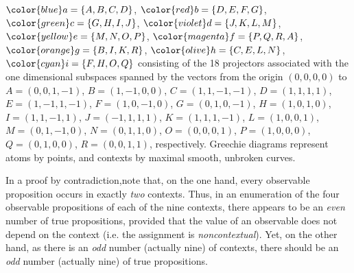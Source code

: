 $\color{blue}a=\{A,B,C,D\}$,
$\color{red}b=\{D,E,F,G\}$,
$\color{green}c=\{G,H,I,J\}$,
$\color{violet}d=\{J,K,L,M\}$,
$\color{yellow}e=\{M,N,O,P\}$,
$\color{magenta}f=\{P,Q,R,A\}$,
$\color{orange}g=\{B,I,K,R\}$,
$\color{olive}h=\{C,E,L,N\}$,
$\color{cyan}i=\{F,H,O,Q\}$
consisting of the 18 projectors associated with the one dimensional subspaces spanned by  the vectors from the origin $(0,0,0,0)$ to
$ A=(0,0,1,-1)    $,
$ B=(1,-1,0,0)    $,
$ C=(1,1,-1,-1)   $,
$ D=(1,1,1,1)     $,
$  E=(1,-1,1,-1)  $,
$  F=(1,0,-1,0)   $,
$  G=(0,1,0,-1)   $,
$  H=(1,0,1,0)    $,
$  I=(1,1,-1,1)   $,
$ J=(-1,1,1,1)    $,
$ K=(1,1,1,-1)    $,
$ L=(1,0,0,1)     $,
$ M=(0,1,-1,0)    $,
$  N=(0,1,1,0)    $,
$  O=(0,0,0,1)    $,
$  P=(1,0,0,0)    $,
$  Q=(0,1,0,0)    $,
$  R=(0,0,1,1)    $, respectively.
%
Greechie diagrams represent atoms by points, and  contexts by maximal smooth, unbroken curves.

{\color{OliveGreen}\bproof
In a proof by contradiction,note that, on the one hand, every observable proposition occurs in exactly {\em two} contexts.
Thus, in an enumeration of the four observable propositions of each of the nine contexts,
there appears to be an {\em even} number of true propositions,
provided that the value of an observable does not depend on the context (i.e. the assignment is {\em noncontextual}).
Yet, on the other hand, as there is an {\em odd} number (actually nine) of contexts,
there should be an {\em odd} number (actually nine) of true propositions.
\bproof
}


